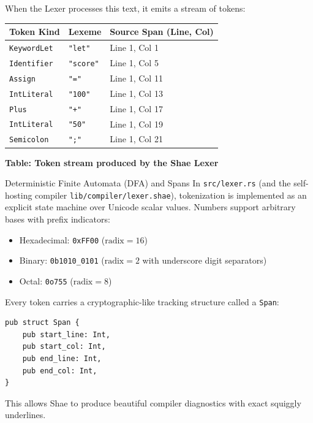 When the Lexer processes this text, it emits a stream of tokens:
\begin{center}\vspace{8pt}
\centering
\begin{tabular}{lll}
\toprule
\textbf{Token Kind} & \textbf{Lexeme} & \textbf{Source Span (Line, Col)} \\
\midrule
\texttt{KeywordLet} & \texttt{"let"} & Line 1, Col 1 \\
\texttt{Identifier} & \texttt{"score"} & Line 1, Col 5 \\
\texttt{Assign} & \texttt{"="} & Line 1, Col 11 \\
\texttt{IntLiteral} & \texttt{"100"} & Line 1, Col 13 \\
\texttt{Plus} & \texttt{"+"} & Line 1, Col 17 \\
\texttt{IntLiteral} & \texttt{"50"} & Line 1, Col 19 \\
\texttt{Semicolon} & \texttt{";"} & Line 1, Col 21 \\
\bottomrule
\end{tabular}
\par\vspace{4pt}\small\textbf{Table: Token stream produced by the Shae Lexer}
\end{center}

\begin{deepbox}{Deterministic Finite Automata (DFA) and Spans}
In \texttt{src/lexer.rs} (and the self-hosting compiler \texttt{lib/compiler/lexer.shae}), tokenization is implemented as an explicit state machine over Unicode scalar values.
Numbers support arbitrary bases with prefix indicators:
\begin{itemize}
    \item Hexadecimal: \texttt{0xFF00} ($\text{radix}=16$)
    \item Binary: \texttt{0b1010\_0101} ($\text{radix}=2$ with underscore digit separators)
    \item Octal: \texttt{0o755} ($\text{radix}=8$)
\end{itemize}
Every token carries a cryptographic-like tracking structure called a \texttt{Span}:
\begin{lstlisting}[language=shaelang]
pub struct Span {
    pub start_line: Int,
    pub start_col: Int,
    pub end_line: Int,
    pub end_col: Int,
}
\end{lstlisting}
This allows Shae to produce beautiful compiler diagnostics with exact squiggly underlines.
\end{deepbox}


